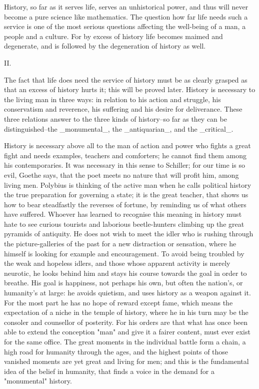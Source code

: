 History, so far as it serves life, serves an unhistorical power, and
thus will never become a pure science like mathematics. The question
how far life needs such a service is one of the most serious
questions affecting the well-being of a man, a people and a culture.
For by excess of history life becomes maimed and degenerate, and is
followed by the degeneration of history as well.


II.

The fact that life does need the service of history must be as
clearly grasped as that an excess of history hurts it; this will be
proved later. History is necessary to the living man in three ways:
in relation to his action and struggle, his conservatism and
reverence, his suffering and his desire for deliverance. These three
relations answer to the three kinds of history--so far as they can be
distinguished--the _monumental_, the _antiquarian_, and the
_critical_.

History is necessary above all to the man of action and power who
fights a great fight and needs examples, teachers and comforters; he
cannot find them among his contemporaries. It was necessary in this
sense to Schiller; for our time is so evil, Goethe says, that the
poet meets no nature that will profit him, among living men. Polybius
is thinking of the active man when he calls political history the
true preparation for governing a state; it is the great teacher, that
shows us how to bear steadfastly the reverses of fortune, by
reminding us of what others have suffered. Whoever has learned to
recognise this meaning in history must hate to see curious tourists
and laborious beetle-hunters climbing up the great pyramids of
antiquity. He does not wish to meet the idler who is rushing through
the picture-galleries of the past for a new distraction or sensation,
where he himself is looking for example and encouragement. To avoid
being troubled by the weak and hopeless idlers, and those whose
apparent activity is merely neurotic, he looks behind him and stays
his course towards the goal in order to breathe. His goal is
happiness, not perhaps his own, but often the nation's, or humanity's
at large: he avoids quietism, and uses history as a weapon against
it. For the most part he has no hope of reward except fame, which
means the expectation of a niche in the temple of history, where he
in his turn may be the consoler and counsellor of posterity. For his
orders are that what has once been able to extend the conception
"man" and give it a fairer content, must ever exist for the same
office. The great moments in the individual battle form a chain, a
high road for humanity through the ages, and the highest points of
those vanished moments are yet great and living for men; and this is
the fundamental idea of the belief in humanity, that finds a voice in
the demand for a "monumental" history.

